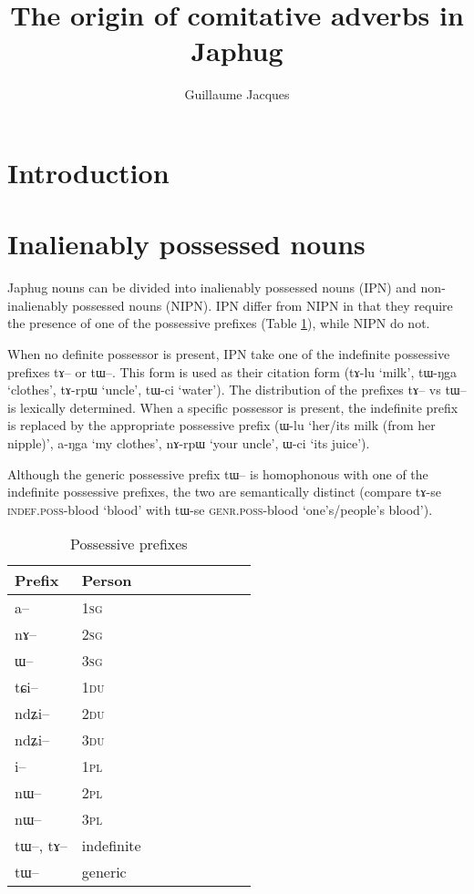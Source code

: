 \documentclass[oldfontcommands,oneside,a4paper,11pt]{article}
\newcommand{\ipa}[1]{{\phon #1}} %
\begin{document}
 
 \title{The origin of comitative adverbs in Japhug}
 \author{Guillaume Jacques}
 \maketitle  
 \section{Introduction}
\linenumbers

 \section{Inalienably possessed nouns} 
Japhug nouns can be divided into inalienably possessed nouns (IPN) and non-inalienably possessed nouns (NIPN). IPN differ from NIPN in that they require the presence of one of the possessive prefixes (Table \ref{tab:possessive}), while NIPN do not.

When no definite possessor is present, IPN take one of the indefinite possessive prefixes \ipa{tɤ--} or \ipa{tɯ--}. This form is used as their citation form (\ipa{tɤ-lu} `milk', \ipa{tɯ-ŋga} `clothes', \ipa{tɤ-rpɯ} `uncle', \ipa{tɯ-ci} `water'). The distribution of the prefixes \ipa{tɤ--} vs \ipa{tɯ--} is lexically determined.  When a specific possessor is present, the indefinite prefix is replaced by the appropriate possessive prefix (\ipa{ɯ-lu} `her/its milk (from her nipple)', \ipa{a-ŋga} `my clothes', \ipa{nɤ-rpɯ} `your uncle', \ipa{ɯ-ci} `its juice'). 

Although the generic possessive prefix \ipa{tɯ--} is homophonous with one of the indefinite possessive prefixes, the two are semantically distinct (compare \ipa{tɤ-se} \textsc{indef.poss}-blood `blood' with \ipa{tɯ-se} \textsc{genr.poss}-blood `one's/people's blood').

\begin{table}[H] \centering
\caption{Possessive prefixes }\label{tab:possessive}
\begin{tabular}{lllllllll} 
\toprule
 Prefix & Person\\
\midrule
\ipa{a--}  & 1\textsc{sg} \\
\ipa{nɤ--}  & 2\textsc{sg}\\
\ipa{ɯ--}  & 3\textsc{sg}\\
\midrule
\ipa{tɕi--}  &  1\textsc{du} \\
\ipa{ndʑi--}  & 2\textsc{du} \\	
\ipa{ndʑi--}  & 3\textsc{du} \\	
\midrule
\ipa{i--}  & 1\textsc{pl} \\
\ipa{nɯ--}  & 2\textsc{pl} \\
\ipa{nɯ--}  & 3\textsc{pl} \\
\midrule
\ipa{tɯ--},  \ipa{tɤ--} & indefinite \\
\ipa{tɯ--}   &  generic \\
\bottomrule
\end{tabular}
\end{table}
\end{document}
